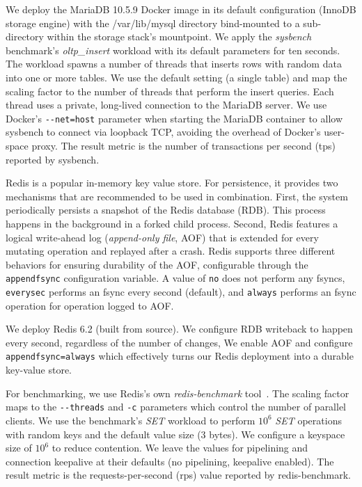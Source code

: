 \documentclass[12pt,a4paper,twoside]{book}
\begin{document}
\begin{description}[noitemsep,leftmargin=1.5cm,labelindent=1cm]
    \item[MariaDB/sysbench] We deploy the MariaDB 10.5.9 Docker image in its default configuration (InnoDB storage engine) with the /var/lib/mysql directory bind-mounted to a sub-directory within the storage stack's mountpoint.
        We apply the \textit{sysbench} benchmark's \textit{oltp\_insert} workload with its default parameters for ten seconds.
        The workload spawns a number of threads that inserts rows with random data into one or more tables.
        We use the default setting (a single table) and map the scaling factor to the number of threads that perform the insert queries.
        Each thread uses a private, long-lived connection to the MariaDB server.
        We use Docker's \lstinline{--net=host} parameter when starting the MariaDB container to allow sysbench to connect via loopback TCP, avoiding the overhead of Docker's user-space proxy.
        The result metric is the number of transactions per second (tps) reported by sysbench.

    \item[Redis-SET] Redis is a popular in-memory key value store.
        For persistence, it provides two mechanisms that are recommended to be used in combination.
        First, the system periodically persists a snapshot of the Redis database (RDB).
        This process happens in the background in a forked child process.
        Second, Redis features a logical write-ahead log (\textit{append-only file}, AOF) that is extended for every mutating operation and replayed after a crash.
        Redis supports three different behaviors for ensuring durability of the AOF, configurable through the \lstinline{appendfsync} configuration variable.
        A value of \lstinline{no} does not perform any fsyncs, \lstinline{everysec} performs an fsync every second (default), and \lstinline{always} performs an fsync operation for operation logged to AOF.
        \cite{RedisPersistenceRedis}

        We deploy Redis 6.2 (built from source).
        We configure RDB writeback to happen every second, regardless of the number of changes,
        We enable AOF and configure \lstinline{appendfsync=always} which effectively turns our Redis deployment into a durable key-value store.

        For benchmarking, we use Redis's own \textit{redis-benchmark} tool~\cite{HowFastRedis}.
        The scaling factor maps to the \lstinline{--threads} and \lstinline{-c} parameters which control the number of parallel clients.
        We use the benchmark's \textit{SET} workload to perform $10^6$ \textit{SET} operations with random keys and the default value size (3 bytes).
        We configure a keyspace size of $10^6$  to reduce contention.
        We leave the values for pipelining and connection keepalive at their defaults (no pipelining, keepalive enabled).
        The result metric is the requests-per-second (rps) value reported by redis-benchmark.


\end{description}
\end{document}
